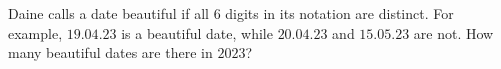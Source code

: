 Daine calls a date beautiful if all $6$ digits in its notation are distinct. For example, $19.04.23$ is a beautiful date, while $20.04.23$ and $15.05.23$ are not. How many beautiful dates are there in $2023$?
